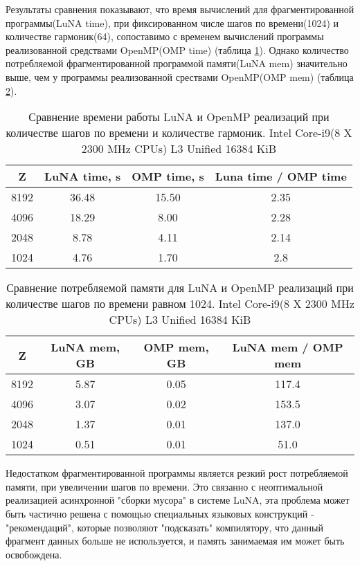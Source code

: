 Результаты сравнения показывают, что время вычислений для фрагментированной программы(LuNA time),
при фиксированном числе шагов по времени(1024) и количестве гармоник(64),
сопоставимо с временем вычислений программы реализованной средствами OpenMP(OMP time) (таблица \ref{table2}).
Однако количество потребляемой фрагментированной программой памяти(LuNA mem) значительно выше,
чем у программы реализованной срествами OpenMP(OMP mem) (таблица \ref{table3}).
\begin{center}
\begin{table}[h!]
\centering
  \begin{tabular}{|c|c|c|c|}
   \hline
	\textbf{Z} & \textbf{LuNA time, s} &  \textbf{OMP time, s} & \textbf{Luna time / OMP time} \\
	\hline
	8192 & 36.48 & 15.50 & 2.35 \\
	\hline
	4096 & 18.29 & 8.00 & 2.28 \\
	\hline
	2048 & 8.78 & 4.11 & 2.14 \\
	\hline
	1024 & 4.76 & 1.70 & 2.8 \\
  \hline 
  \end{tabular}
  \captionsetup{justification=centering}
  \caption{Сравнение времени работы LuNA и OpenMP реализаций при количестве шагов по времени и количестве гармоник. Intel Core-i9(8 X 2300 MHz CPUs) L3 Unified 16384 KiB}\label{table2}
\end{table}
\end{center}
\begin{center}
\begin{table}[h!]
\centering
  \begin{tabular}{|c|c|c|c|}
   \hline
	\textbf{Z} & \textbf{LuNA mem, GB} & \textbf{OMP mem, GB}  & \textbf{LuNA mem / OMP mem} \\
	\hline
	8192 & 5.87 & 0.05 & 117.4 \\
	\hline
	4096 & 3.07 & 0.02 & 153.5 \\
	\hline
	2048 & 1.37 & 0.01 & 137.0 \\
	\hline
	1024 & 0.51 & 0.01 & 51.0 \\
  \hline 
  \end{tabular}
  \captionsetup{justification=centering}
  \caption{Сравнение потребляемой памяти для LuNA и OpenMP реализаций при количестве шагов по времени равном 1024. Intel Core-i9(8 X 2300 MHz CPUs) L3 Unified 16384 KiB}\label{table3}
\end{table}
\end{center}

Недостатком фрагментированной программы является резкий рост потребляемой памяти, при увеличении шагов по времени.
Это связанно с неоптимальной реализацией асинхронной "сборки мусора" в системе LuNA,
эта проблема может быть частично решена с помощью специальных языковых конструкций - "рекомендаций",
которые позволяют "подсказать" компилятору, что данный фрагмент данных больше не используется, и память занимаемая им может быть освобождена.

